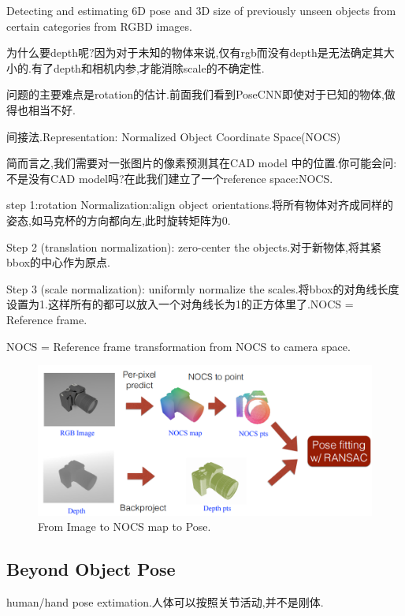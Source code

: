 Detecting and estimating 6D pose and 3D size of previously unseen objects from certain categories from RGBD images.

为什么要depth呢?因为对于未知的物体来说,仅有rgb而没有depth是无法确定其大小的.有了depth和相机内参,才能消除scale的不确定性.

问题的主要难点是rotation的估计.前面我们看到PoseCNN即使对于已知的物体,做得也相当不好.

间接法.Representation: Normalized Object Coordinate Space(NOCS)

简而言之,我们需要对一张图片的像素预测其在CAD model 中的位置.你可能会问:不是没有CAD model吗?在此我们建立了一个reference space:NOCS.

step 1:rotation Normalization:align object orientations.将所有物体对齐成同样的姿态,如马克杯的方向都向左,此时旋转矩阵为0.

Step 2 (translation normalization): zero-center the objects.对于新物体,将其紧bbox的中心作为原点.

Step 3 (scale normalization): uniformly normalize the scales.将bbox的对角线长度设置为1.这样所有的都可以放入一个对角线长为1的正方体里了.NOCS = Reference frame.

NOCS = Reference frame transformation from NOCS to camera space.

\begin{figure}[htbp]
   \centering
   \includegraphics[scale=0.65]{figures/image_nocs_pose.png}
   \caption{From Image to NOCS map to Pose.}
   \label{}
\end{figure}

\subsection{Beyond Object Pose}
human/hand pose extimation.人体可以按照关节活动,并不是刚体.
